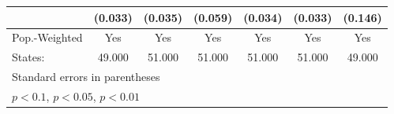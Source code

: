 {\begin{tabular}{l*{6}{c}}
            &     (0.033)         &     (0.035)         &     (0.059)         &     (0.034)         &     (0.033)         &     (0.146)         \\
\hline
Pop.-Weighted&         Yes         &         Yes         &         Yes         &         Yes         &         Yes         &         Yes         \\
States:     &      49.000         &      51.000         &      51.000         &      51.000         &      51.000         &      49.000         \\
\hline\hline
\multicolumn{7}{l}{\footnotesize Standard errors in parentheses}\\
\multicolumn{7}{l}{\footnotesize \sym{*} \(p<0.1\), \sym{**} \(p<0.05\), \sym{***} \(p<0.01\)}\\
\end{tabular}
}
